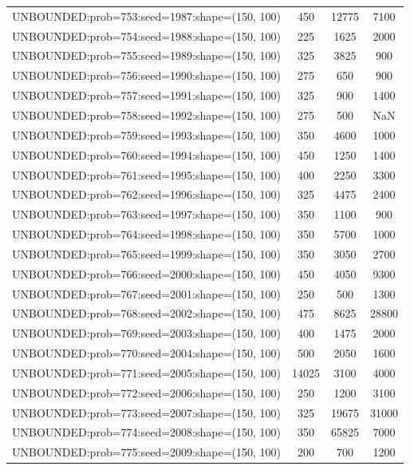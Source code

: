 \begin{longtable}{lccc}
UNBOUNDED:prob=753:seed=1987:shape=(150, 100) &      450 & 12775 &   7100 \\
UNBOUNDED:prob=754:seed=1988:shape=(150, 100) &      225 &  1625 &   2000 \\
UNBOUNDED:prob=755:seed=1989:shape=(150, 100) &      325 &  3825 &    900 \\
UNBOUNDED:prob=756:seed=1990:shape=(150, 100) &      275 &   650 &    900 \\
UNBOUNDED:prob=757:seed=1991:shape=(150, 100) &      325 &   900 &   1400 \\
UNBOUNDED:prob=758:seed=1992:shape=(150, 100) &      275 &   500 &    NaN \\
UNBOUNDED:prob=759:seed=1993:shape=(150, 100) &      350 &  4600 &   1000 \\
UNBOUNDED:prob=760:seed=1994:shape=(150, 100) &      450 &  1250 &   1400 \\
UNBOUNDED:prob=761:seed=1995:shape=(150, 100) &      400 &  2250 &   3300 \\
UNBOUNDED:prob=762:seed=1996:shape=(150, 100) &      325 &  4475 &   2400 \\
UNBOUNDED:prob=763:seed=1997:shape=(150, 100) &      350 &  1100 &    900 \\
UNBOUNDED:prob=764:seed=1998:shape=(150, 100) &      350 &  5700 &   1000 \\
UNBOUNDED:prob=765:seed=1999:shape=(150, 100) &      350 &  3050 &   2700 \\
UNBOUNDED:prob=766:seed=2000:shape=(150, 100) &      450 &  4050 &   9300 \\
UNBOUNDED:prob=767:seed=2001:shape=(150, 100) &      250 &   500 &   1300 \\
UNBOUNDED:prob=768:seed=2002:shape=(150, 100) &      475 &  8625 &  28800 \\
UNBOUNDED:prob=769:seed=2003:shape=(150, 100) &      400 &  1475 &   2000 \\
UNBOUNDED:prob=770:seed=2004:shape=(150, 100) &      500 &  2050 &   1600 \\
UNBOUNDED:prob=771:seed=2005:shape=(150, 100) &    14025 &  3100 &   4000 \\
UNBOUNDED:prob=772:seed=2006:shape=(150, 100) &      250 &  1200 &   3100 \\
UNBOUNDED:prob=773:seed=2007:shape=(150, 100) &      325 & 19675 &  31000 \\
UNBOUNDED:prob=774:seed=2008:shape=(150, 100) &      350 & 65825 &   7000 \\
UNBOUNDED:prob=775:seed=2009:shape=(150, 100) &      200 &   700 &   1200 \\

\end{longtable}
